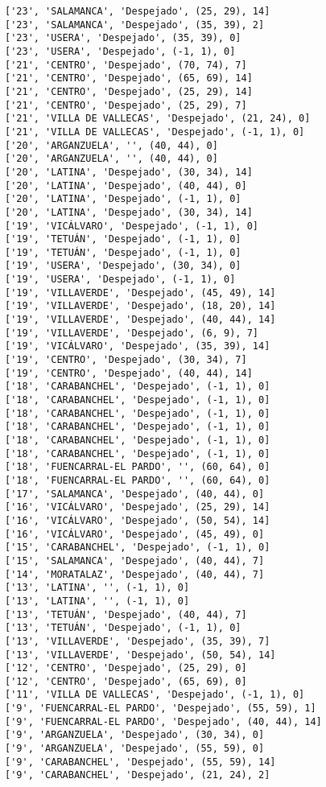 \documentclass[11pt]{article}
\begin{document}
\begin{Verbatim}[commandchars=\\\{\}]
['23', 'SALAMANCA', 'Despejado', (25, 29), 14]
['23', 'SALAMANCA', 'Despejado', (35, 39), 2]
['23', 'USERA', 'Despejado', (35, 39), 0]
['23', 'USERA', 'Despejado', (-1, 1), 0]
['21', 'CENTRO', 'Despejado', (70, 74), 7]
['21', 'CENTRO', 'Despejado', (65, 69), 14]
['21', 'CENTRO', 'Despejado', (25, 29), 14]
['21', 'CENTRO', 'Despejado', (25, 29), 7]
['21', 'VILLA DE VALLECAS', 'Despejado', (21, 24), 0]
['21', 'VILLA DE VALLECAS', 'Despejado', (-1, 1), 0]
['20', 'ARGANZUELA', '', (40, 44), 0]
['20', 'ARGANZUELA', '', (40, 44), 0]
['20', 'LATINA', 'Despejado', (30, 34), 14]
['20', 'LATINA', 'Despejado', (40, 44), 0]
['20', 'LATINA', 'Despejado', (-1, 1), 0]
['20', 'LATINA', 'Despejado', (30, 34), 14]
['19', 'VICÁLVARO', 'Despejado', (-1, 1), 0]
['19', 'TETUÁN', 'Despejado', (-1, 1), 0]
['19', 'TETUÁN', 'Despejado', (-1, 1), 0]
['19', 'USERA', 'Despejado', (30, 34), 0]
['19', 'USERA', 'Despejado', (-1, 1), 0]
['19', 'VILLAVERDE', 'Despejado', (45, 49), 14]
['19', 'VILLAVERDE', 'Despejado', (18, 20), 14]
['19', 'VILLAVERDE', 'Despejado', (40, 44), 14]
['19', 'VILLAVERDE', 'Despejado', (6, 9), 7]
['19', 'VICÁLVARO', 'Despejado', (35, 39), 14]
['19', 'CENTRO', 'Despejado', (30, 34), 7]
['19', 'CENTRO', 'Despejado', (40, 44), 14]
['18', 'CARABANCHEL', 'Despejado', (-1, 1), 0]
['18', 'CARABANCHEL', 'Despejado', (-1, 1), 0]
['18', 'CARABANCHEL', 'Despejado', (-1, 1), 0]
['18', 'CARABANCHEL', 'Despejado', (-1, 1), 0]
['18', 'CARABANCHEL', 'Despejado', (-1, 1), 0]
['18', 'CARABANCHEL', 'Despejado', (-1, 1), 0]
['18', 'FUENCARRAL-EL PARDO', '', (60, 64), 0]
['18', 'FUENCARRAL-EL PARDO', '', (60, 64), 0]
['17', 'SALAMANCA', 'Despejado', (40, 44), 0]
['16', 'VICÁLVARO', 'Despejado', (25, 29), 14]
['16', 'VICÁLVARO', 'Despejado', (50, 54), 14]
['16', 'VICÁLVARO', 'Despejado', (45, 49), 0]
['15', 'CARABANCHEL', 'Despejado', (-1, 1), 0]
['15', 'SALAMANCA', 'Despejado', (40, 44), 7]
['14', 'MORATALAZ', 'Despejado', (40, 44), 7]
['13', 'LATINA', '', (-1, 1), 0]
['13', 'LATINA', '', (-1, 1), 0]
['13', 'TETUÁN', 'Despejado', (40, 44), 7]
['13', 'TETUÁN', 'Despejado', (-1, 1), 0]
['13', 'VILLAVERDE', 'Despejado', (35, 39), 7]
['13', 'VILLAVERDE', 'Despejado', (50, 54), 14]
['12', 'CENTRO', 'Despejado', (25, 29), 0]
['12', 'CENTRO', 'Despejado', (65, 69), 0]
['11', 'VILLA DE VALLECAS', 'Despejado', (-1, 1), 0]
['9', 'FUENCARRAL-EL PARDO', 'Despejado', (55, 59), 1]
['9', 'FUENCARRAL-EL PARDO', 'Despejado', (40, 44), 14]
['9', 'ARGANZUELA', 'Despejado', (30, 34), 0]
['9', 'ARGANZUELA', 'Despejado', (55, 59), 0]
['9', 'CARABANCHEL', 'Despejado', (55, 59), 14]
['9', 'CARABANCHEL', 'Despejado', (21, 24), 2]

\end{Verbatim}
\end{document}
